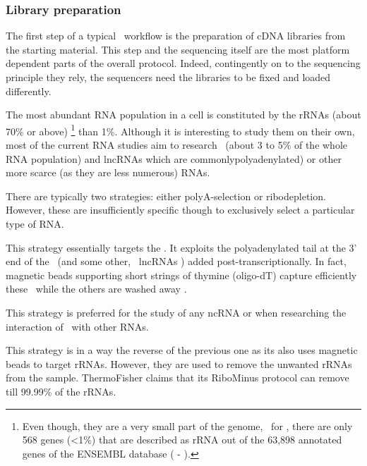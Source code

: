 \subsubsection{Library preparation}

The first step of a typical \Rnaseq\ workflow is the preparation of \gls{cDNA}
libraries from the starting material. This step and the sequencing itself are
the most platform dependent parts of the overall protocol. Indeed, contingently
on to the sequencing principle they rely, the sequencers need the libraries to
be fixed and loaded differently.


The most abundant \gls{RNA} population in a cell is constituted by the
\glspl{rRNA} (about 70\% or above) \footnote{Even though, they
are a very small part of the genome, \eg\ for , there are
only 568 genes (<1\%) that are described as \gls{rRNA} out of the 63,898
annotated genes of the ENSEMBL database ( - ).}
than 1\%. Although it is interesting to study them on their own,
most of the current \gls{RNA} studies aim to research \mRNAs\ (about 3 to 5\% of
the whole \gls{RNA} population)  and \glspl{lncRNA} which
are commonlypolyadenylated) or other more scarce (as they are less numerous)
\glspl{RNA}.

There are typically two strategies: either polyA-selection or ribodepletion.
However, these are insufficiently specific though to exclusively select a
particular type of \gls{RNA}.


This strategy essentially targets the \mRNAs. It exploits the polyadenylated
tail at the 3' end of the \mRNAs\ (and some other, \eg\ \glspl{lncRNA}
) added
post-transcriptionally. In fact, magnetic beads supporting short
strings of thymine (oligo-dT) capture efficiently these \mRNAs\ while the others
are washed away .


This strategy is preferred for the study of any \gls{ncRNA} or when researching
the interaction of \mRNAs\ with other \glspl{RNA}. 

This strategy is in a way the reverse of the previous one as its also
uses magnetic beads to target \glspl{rRNA}. However, they are used to remove the
unwanted \glspl{rRNA} from the sample. ThermoFisher claims that its
RiboMinus protocol can remove till 99.99\% of the \glspl{rRNA}.

